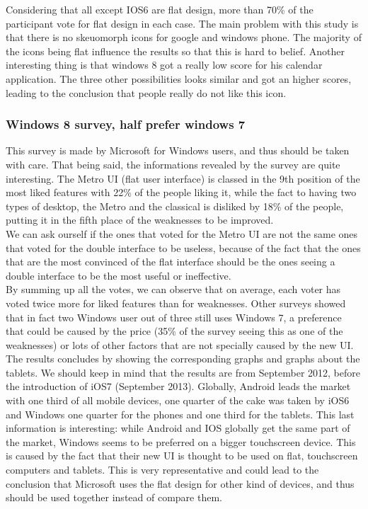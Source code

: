 \documentclass[a4paper,11pt] {article}
\theoremstyle{definition}
\begin{document}
    Considering that all except IOS6 are flat design, more than 70\% of the participant vote for flat design in each case. The main problem with this study is that there is no skeuomorph icons for google and windows phone. The majority of the icons being flat influence the results so that this is hard to belief. Another interesting thing is that windows 8 got a really low score for his calendar application. The three other possibilities looks similar and got an higher scores, leading to the conclusion that people really do not like this icon.

    \subsubsection{Windows 8 survey, half prefer windows 7\cite{windows8Survey}}

    This survey is made by Microsoft for Windows users, and thus should be taken with care. That being said, the informations revealed by the survey are quite interesting. The Metro UI (flat user interface) is classed in the 9th position of the most liked features with 22\% of the people liking it, while the fact to having two types of desktop, the Metro and the classical is disliked by 18\% of the people, putting it in the fifth place of the weaknesses to be improved.\\

    We can ask ourself if the ones that voted for the Metro UI are not the same ones that voted for the double interface to be useless, because of the fact that the ones that are the most convinced of the flat interface should be the ones seeing a double interface to be the most useful or ineffective.\\

    By summing up all the votes, we can observe that on average, each voter has voted twice more for liked features than for weaknesses. Other surveys showed that in fact two Windows user out of three still uses Windows 7, a preference that could be caused by the price (35\% of the survey seeing this as one of the weaknesses) or lots of other factors that are not specially caused by the new UI.\\

    The results concludes by showing the corresponding graphs and graphs about the tablets. We should keep in mind that the results are from September 2012, before the introduction of iOS7 (September 2013). Globally, Android leads the market with one third of all mobile devices, one quarter of the cake was taken by iOS6 and Windows one quarter for the phones and one third for the tablets. This last information is interesting: while Android and IOS globally get the same part of the market, Windows seems to be preferred on a bigger touchscreen device. This is caused by the fact that their new UI is thought to be used on flat, touchscreen computers and tablets. This is very representative and could lead to the conclusion that Microsoft uses the flat design for other kind of devices, and thus should be used together instead of compare them.
\end{document}
